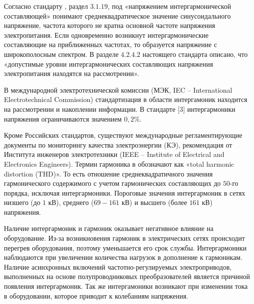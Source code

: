 Согласно стандарту \cite{GOST32144-2013}, раздел $3.1.19$, под «напряжением интергармонической составляющей» понимают среднеквадратическое значение синусоидального напряжение, частота которого не кратна основной частоте напряжения электропитания.
Если одновременно возникнут интергармонические составляющие на приближенных частотах, то образуется напряжение с широкополосным спектром. В разделе $4.2.4.2$ настоящего стандарта описано, что «допустимые уровни интергармонических составляющих напряжения электропитания находятся на рассмотрении».

В международной электротехнической комиссии (МЭК, IEC -- International Electrotechnical Commission) стандартизация в области интергамоник находится на рассмотрении и накоплении информации. В стандарте [3] интергармоники напряжения ограничиваются значением $0,2\%$.

Кроме Российских стандартов, существуют международные регламентирующие документы по мониторингу качества электроэнергии (КЭ), рекомендация от Института инженеров электротехники (IEEE – Institute of Electrical and Electronics Engineers). Термин гармоника в \cite{6826459} обозначают как «total harmonic distortion (THD)».
То есть отношение среднеквадратичного значения гармонического содержимого с учетом гармонических составляющих до $50$-го порядка, исключая интергармоники. Пороговые значения интергармоник в сетях низшего (до $1$ кВ), среднего ($69-161$ кВ) и высшего (более $161$ кВ) напряжения.

Наличие интергармоник и гармоник оказывает негативное влияние на оборудование. Из-за возникновения гармоник в электрических сетях происходит перегрев оборудования, поэтому уменьшается его срок службы. Интергармоники наблюдаются при увеличении количества нагрузок в дополнение к гармоникам. Наличие асинхронных включений частотно-регулируемых электроприводов, выполненных на основе полупроводниковых преобразователей является причиной появления интергармоник. Так же интергамоники возникают при изменении тока в оборудовании, которое приводит к колебаниям напряжения. 

